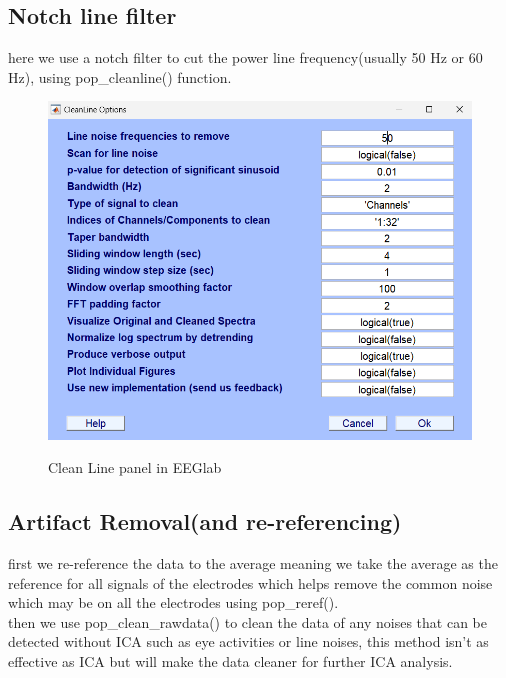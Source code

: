 \documentclass[11pt]{article}
\begin{document}
\subsection{Notch line filter}
here we use a notch filter to cut the power line frequency(usually 50 Hz or 60 Hz),
using pop\_cleanline() function. \\
\begin{figure}[H]
    \begin{center}
        \includegraphics[scale=0.6]{Fig/cleanLine_data1.png}
        \label{fig:cleanLine}
        \caption{Clean Line panel in EEGlab}
    \end{center}
\end{figure}

\subsection{Artifact Removal(and re-referencing)}
first we re-reference the data to the average meaning we take the average 
as the reference for all signals of the electrodes which helps remove the common
noise which may be on all the electrodes using pop\_reref(). \\
then we use pop\_clean\_rawdata() to clean the data of any noises that can be 
detected without ICA such as eye activities or line noises, this method isn't as
effective as ICA but will make the data cleaner for further ICA analysis. \\
\end{document}
